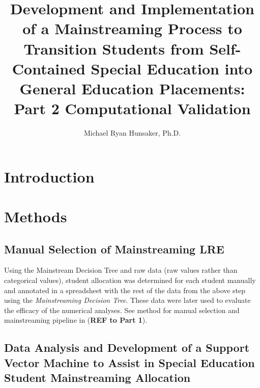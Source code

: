 \documentclass[twoside]{article}
\title{Development and Implementation of a Mainstreaming Process to Transition Students from Self-Contained Special Education into General Education Placements: Part 2 Computational Validation}
\author[1]{Michael Ryan Hunsaker, Ph.D.}
\affil[1]{University of Utah, Salt Lake City, UT, USA}
\begin{document}
%
\maketitle
%
\begin{abstract}
%
%
%
%
%
%
\end{abstract}
%
\section{Introduction}
%
%
%
\section{Methods}
\subsection{Manual Selection of Mainstreaming LRE}
Using the Mainstream Decision Tree and raw data (raw values rather than categorical values), student allocation was determined for each student manually and annotated in a spreadsheet with the rest of the data from the above step using the \textit{Mainstreaming Decision Tree}. These data were later used to evaluate the efficacy of the numerical analyses. See method for manual selection and mainstreaming pipeline in (\textbf{REF to Part 1}).

\subsection{Data Analysis and Development of a Support Vector Machine to Assist in Special Education Student Mainstreaming Allocation}
\end{document}
